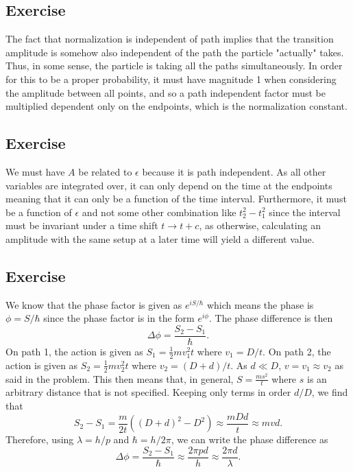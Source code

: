 \subsection{Exercise}
The fact that normalization is independent of path implies that the transition amplitude is somehow also independent of the path the particle "actually" takes. Thus, in some sense, the particle is taking all the paths simultaneously. In order for this to be a proper probability, it must have magnitude 1 when considering the amplitude between all points, and so a path independent factor must be multiplied dependent only on the endpoints, which is the normalization constant. 

\subsection{Exercise}
We must have $A$ be related to $\epsilon$ because it is path independent. As all other variables are integrated over, it can only depend on the time at the endpoints meaning that it can only be a function of the time interval. Furthermore, it must be a function of $\epsilon$ and not some other combination like $t_2^2-t_1^2$ since the interval must be invariant under a time shift $t\to t+c$, as otherwise, calculating an amplitude with the same setup at a later time will yield a different value. 


\subsection{Exercise}
We know that the phase factor is given as $e^{i S/\hbar}$ which means the phase is $\phi = S/\hbar$ since the phase factor is in the form $e^{i\phi}$. The phase difference is then 
\begin{equation}
    \Delta \phi = \frac{S_2 - S_1}{\hbar}.
\end{equation}
On path 1, the action is given as $S_1 = \frac{1}{2}mv_1^2 t$ where $v_1 = D/t$. On path 2, the action is given as $S_2 = \frac{1}{2}mv_2^2 t$ where $v_2 = (D + d)/t$. As $d \ll D$, $v = v_1 \approx v_2$ as said in the problem. This then means that, in general, $S = \frac{ms^2}{t}$ where $s$ is an arbitrary distance that is not specified. Keeping only terms in order $d/D$, we find that 
\begin{equation}
    S_2 - S_1 = \frac{m}{2t} ((D + d)^2 - D^2) \approx \frac{mDd}{t} \approx mvd.
\end{equation}
Therefore, using $\lambda = h/p$ and $\hbar = h/2\pi$, we can write the phase difference as 
\begin{equation}
    \Delta \phi = \frac{S_2 - S_1}{\hbar} \approx \frac{2\pi pd}{h} \approx \frac{2\pi d}{\lambda}. 
\end{equation}
